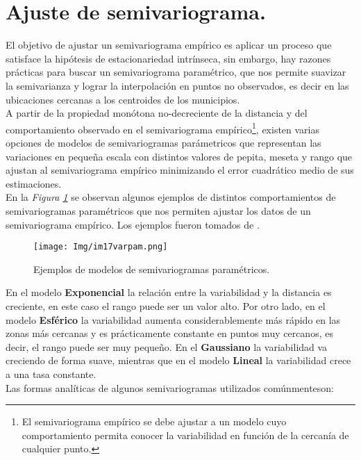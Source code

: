 \documentclass[11pt, oneside]{book}
\begin{document}
\bigskip

\section{Ajuste de semivariograma.}
El objetivo de ajustar un semivariograma empírico es aplicar un proceso que satisface la hipótesis de estacionariedad intrínseca, sin embargo, hay razones prácticas para buscar un semivariograma paramétrico, que nos permite suavizar la semivarianza y lograr la interpolación en puntos no observados, es decir en las ubicaciones cercanas a los centroides de los municipios.\\

A partir de la propiedad monótona no-decreciente de la distancia y del comportamiento observado en el semivariograma empírico\footnote{El semivariograma empírico se debe ajustar a un modelo cuyo comportamiento permita conocer la variabilidad en función de la cercanía de cualquier punto.}, existen varias opciones de modelos de semivariogramas parámetricos que representan las variaciones en pequeña escala con distintos valores de pepita, meseta y rango que ajustan al semivariograma empírico minimizando el error cuadrático medio de sus estimaciones.\\ 

En la \emph{Figura \ref{fig17.varpam}} se observan algunos ejemplos de distintos comportamientos de semivariogramas paramétricos que nos permiten ajustar los datos de un semivariograma empírico. Los ejemplos fueron tomados de \cite{diaz_itam}.\\

\begin{figure}[ht]
    \centering
    \texttt{[image: Img/im17varpam.png]}
  \caption{Ejemplos de modelos de semivariogramas paramétricos.}
  \label{fig17.varpam}
\end{figure}

En el modelo \textbf{Exponencial} la relación entre la variabilidad y la distancia es creciente, en este caso el rango puede ser un valor alto. Por otro lado, en el modelo \textbf{Esférico} la variabilidad aumenta considerablemente más rápido en las zonas más cercanas y es prácticamente constante en puntos muy cercanos, es decir, el rango puede ser muy pequeño. En el \textbf{Gaussiano} la variabilidad va creciendo de forma suave, mientras que en el modelo \textbf{Lineal} la variabilidad crece a una tasa constante.\\

Las formas analíticas de algunos semivariogramas utilizados comúnmenteson:
\end{document}
